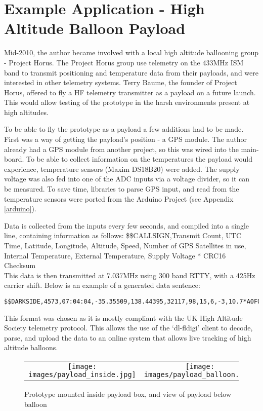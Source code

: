 \documentclass[a4paper,12pt]{article}
\begin{document}
\section{Example Application - High Altitude Balloon Payload}
\label{example_app}
Mid-2010, the author became involved with a local high altitude ballooning group - Project Horus. The Project Horus group use telemetry on the 433MHz ISM band to transmit positioning and temperature data from their payloads, and were interested in other telemetry systems. Terry Baume, the founder of Project Horus, offered to fly a HF telemetry transmitter as a payload on a future launch. This would allow testing of the prototype in the harsh environments present at high altitudes. 

To be able to fly the prototype as a payload a few additions had to be made. First was a way of getting the payload's position - a GPS module. The author already had a GPS module from another project, so this was wired into the main-board. To be able to collect information on the temperatures the payload would experience, temperature sensors (Maxim DS18B20) were added. The supply voltage was also fed into one of the ADC inputs via a voltage divider, so it can be measured. To save time, libraries to parse GPS input, and read from the temperature sensors were ported from the Arduino Project (see Appendix \ref{arduino}).

Data is collected from the inputs every few seconds, and compiled into a single line, containing information as follows:
\$\$CALLSIGN,Transmit Count, UTC Time, Latitude, Longitude, Altitude, Speed, Number of GPS Satellites in use, Internal Temperature, External Temperature, Supply Voltage * CRC16 Checksum\\
This data is then transmitted at 7.037MHz using 300 baud RTTY, with a 425Hz carrier shift.
Below is an example of a generated data sentence:
\begin{verbatim}
$$DARKSIDE,4573,07:04:04,-35.35509,138.44395,32117,98,15,6,-3,10.7*A0F0
\end{verbatim}

This format was chosen as it is mostly compliant with the UK High Altitude Society telemetry protocol\citep{ref:ukhas}. This allows the use of the `dl-fldigi' client to decode, parse, and upload the data to an online system that allows live tracking of high altitude balloons.

\begin{figure}[h]
  \begin{center}
  \begin{tabular}{cc}
    \texttt{[image: images/payload\_inside.jpg]} &
    \texttt{[image: images/payload\_balloon.jpg]}\\
  \end{tabular}
  \end{center}
  \caption{Prototype mounted inside payload box, and view of payload below balloon}
  \label{fig:payload_inside}
\end{figure}
\end{document}
